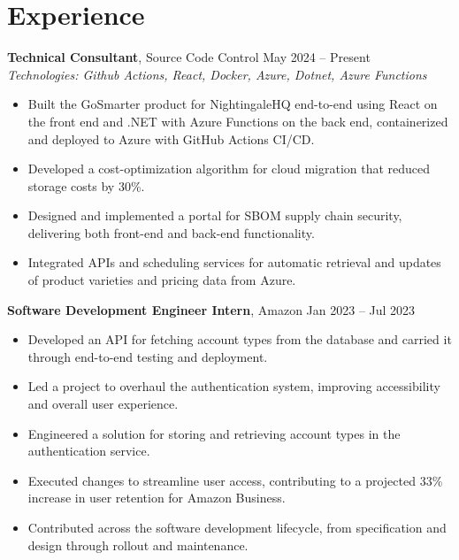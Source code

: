 \documentclass[11pt,a4paper]{article}
\begin{document}
\section{Experience}
\textbf{Technical Consultant}, Source Code Control \hfill May 2024 -- Present
\\ \textit{Technologies: Github Actions, React, Docker, Azure, Dotnet, Azure Functions}
\begin{itemize}
  \item Built the GoSmarter product for NightingaleHQ end-to-end using React on the front end and .NET with Azure Functions on the back end, containerized and deployed to Azure with GitHub Actions CI/CD.
  \item Developed a cost-optimization algorithm for cloud migration that reduced storage costs by 30\%.
  \item Designed and implemented a portal for SBOM supply chain security, delivering both front-end and back-end functionality.
  \item Integrated APIs and scheduling services for automatic retrieval and updates of product varieties and pricing data from Azure.
\end{itemize}
\vspace{2pt}
\textbf{Software Development Engineer Intern}, Amazon \hfill Jan 2023 -- Jul 2023
\begin{itemize}
  \item Developed an API for fetching account types from the database and carried it through end-to-end testing and deployment.
  \item Led a project to overhaul the authentication system, improving accessibility and overall user experience.
  \item Engineered a solution for storing and retrieving account types in the authentication service.
  \item Executed changes to streamline user access, contributing to a projected 33\% increase in user retention for Amazon Business.
  \item Contributed across the software development lifecycle, from specification and design through rollout and maintenance.
\end{itemize}
\vspace{2pt}
\end{document}

